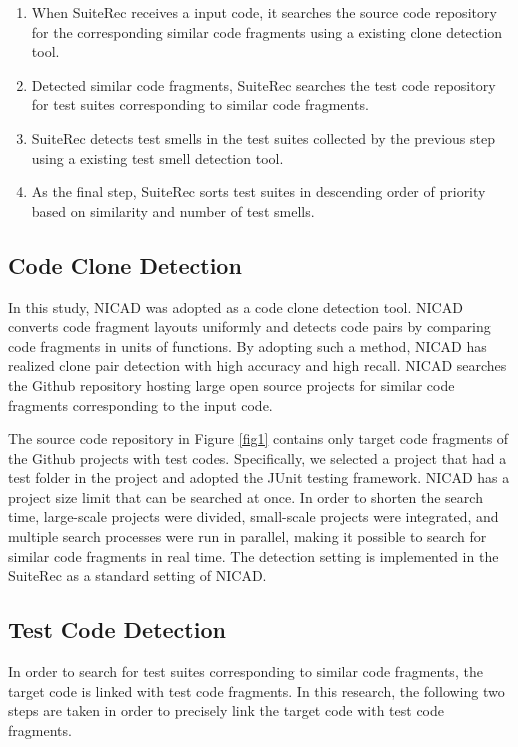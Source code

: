 \documentclass[conference]{IEEEtran}
\begin{document}
\begin{enumerate}
\renewcommand{\labelenumi}{(\arabic{enumi})}
\item When SuiteRec receives a input code, it searches the source code repository for the corresponding similar code fragments using a existing clone detection tool.
\item Detected similar code fragments, SuiteRec searches the test code repository for test suites corresponding to similar code fragments.
\item SuiteRec detects test smells in the test suites collected by the previous step using a existing test smell detection tool.
\item As the final step, SuiteRec sorts test suites in descending order of priority based on similarity and number of test smells.
\end{enumerate}


\subsection{Code Clone Detection}
In this study, NICAD\cite{b2} was adopted as a code clone detection tool. NICAD converts code fragment layouts uniformly and detects code pairs by comparing code fragments in units of functions. By adopting such a method, NICAD has realized clone pair detection with high accuracy and high recall. NICAD searches the Github repository hosting large open source projects for similar code fragments corresponding to the input code.

The source code repository in Figure \ref{fig1} contains only target code fragments of the Github projects with test codes. Specifically, we selected a project that had a test folder in the project and adopted the JUnit testing framework. NICAD has a project size limit that can be searched at once.  In order to shorten the search time, large-scale projects were divided, small-scale projects were integrated, and multiple search processes were run in parallel, making it possible to search for similar code fragments in real time. The detection setting is implemented in the SuiteRec as a standard setting of NICAD.

\subsection{Test Code Detection}
In order to search for test suites corresponding to similar code fragments, the target code is linked with test code fragments. In this research, the following two steps are taken in order to precisely link the target code with test code fragments.
\end{document}
